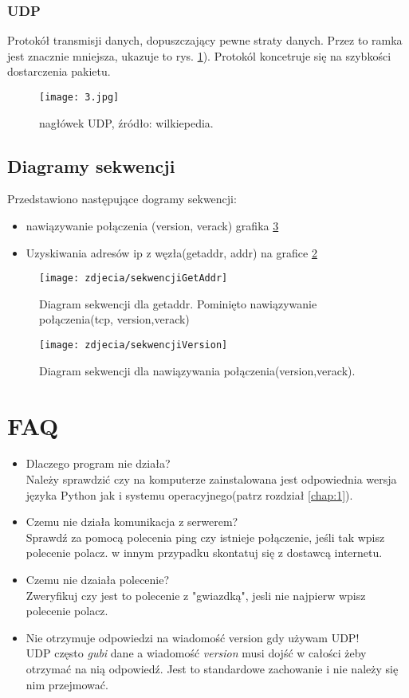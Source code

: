 \documentclass[a4paper,polish,12pt]{article}
\begin{document}
\subsubsection{UDP}
Protokół transmisji danych,  dopuszczający pewne straty danych. Przez to ramka jest znacznie mniejsza, ukazuje to rys. \ref{zdj:4}). Protokól koncetruje się na szybkości dostarczenia pakietu.
\begin{figure}
\label{zdj:4}
\centering
\texttt{[image: 3.jpg]}
\caption { nagłówek UDP, źródło: wilkiepedia.}
\end{figure}
\subsection{Diagramy sekwencji}
Przedstawiono następujące dogramy sekwencji:
\begin{itemize}
\item nawiązywanie połączenia (version, verack) grafika \ref{zdj:sek:version}
\item Uzyskiwania adresów ip z węzła(getaddr, addr) na grafice \ref{zdj:sek:getaddr}
\end{itemize}

\begin{figure}

\caption{Diagram sekwencji dla getaddr. Pominięto nawiązywanie połączenia(tcp, version,verack)}
\label{zdj:sek:getaddr}
\centering
\texttt{[image: zdjecia/sekwencjiGetAddr]}
\end{figure}

\begin{figure}

\caption{Diagram sekwencji dla nawiązywania połączenia(version,verack).}
\label{zdj:sek:version}
\centering
\texttt{[image: zdjecia/sekwencjiVersion]}
\end{figure}
\section{FAQ}
\begin{itemize}
\item Dlaczego program nie działa?\\
Należy sprawdzić czy na komputerze zainstalowana jest odpowiednia wersja języka Python jak i systemu operacyjnego(patrz rozdział \autoref{chap:1}).
\item Czemu nie działa komunikacja z serwerem?\\
Sprawdź za pomocą polecenia ping czy istnieje połączenie, jeśli tak wpisz polecenie polacz. w innym przypadku skontatuj się z dostawcą internetu.
\item Czemu nie dzaiała polecenie?\\
Zweryfikuj czy jest to polecenie z "gwiazdką", jesli nie najpierw wpisz polecenie polacz.
\item Nie otrzymuje odpowiedzi na wiadomość version gdy używam UDP!\\
UDP często \textit{gubi} dane a wiadomość \textit{version} musi dojść w całości żeby otrzymać na nią odpowiedź. Jest to standardowe zachowanie i nie należy się nim przejmować.
\end{itemize}
\end{document}
